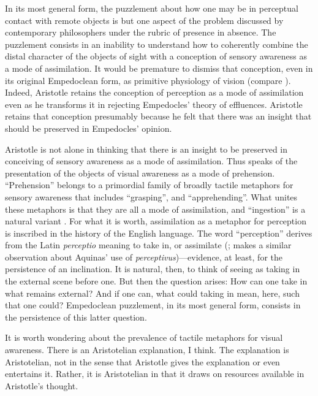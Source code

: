 In its most general form, the puzzlement about how one may be in perceptual contact with remote objects is but one aspect of the problem discussed by contemporary philosophers under the rubric of presence in absence. The puzzlement consists in an inability to understand how to coherently combine the distal character of the objects of sight with a conception of sensory awareness as a mode of assimilation. It would be premature to dismiss that conception, even in its original Empedoclean form, as primitive physiology of vision (compare \citealt[318 n106]{Cherniss:1935fk}). Indeed, Aristotle retains the conception of perception as a mode of assimilation even as he transforms it in rejecting Empedocles' theory of effluences. Aristotle retains that conception presumably because he felt that there was an insight that should be preserved in Empedocles' opinion. 

Aristotle is not alone in thinking that there is an insight to be preserved in conceiving of sensory awareness as a mode of assimilation. Thus \citet{Broad:1952kx} speaks of the presentation of the objects of visual awareness as a mode of prehension.  ``Prehension'' belongs to a primordial family of broadly tactile metaphors for sensory awareness that includes ``grasping'', and ``apprehending''. What unites these metaphors is that they are all a mode of assimilation, and ``ingestion'' is a natural variant \citep[see][7]{Johnston:2006uq,Price:1932fk}. For what it is worth, assimilation as a metaphor for perception is inscribed in the history of the English language. The word ``perception'' derives from the Latin \emph{perceptio} meaning to take in, or assimilate (\citealt[102]{Burnyeat:1979mv}; \citealt[51]{Pasnau:1997aa} makes a similar observation about Aquinas' use of \emph{perceptivus})---evidence, at least, for the persistence of an inclination. It is natural, then, to think of seeing as taking in the external scene before one. But then the question arises: How can one take in what remains external? And if one can, what could taking in mean, here, such that one could? Empedoclean puzzlement, in its most general form, consists in the persistence of this latter question.

It is worth wondering about the prevalence of tactile metaphors for visual awareness. There is an Aristotelian explanation, I think. The explanation is Aristotelian, not in the sense that Aristotle gives the explanation or even entertains it. Rather, it is Aristotelian in that it draws on resources available in Aristotle's thought.

